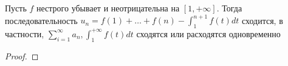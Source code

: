 
\begin{theorem}
    Пусть \(f\) нестрого убывает и неотрицательна на \([1, +\infty]\). Тогда последовательность \(u_n = f(1) + \dots + f(n) - \int_{1}^{n+1}f(t)dt\) сходится, в частности, \(\sum_{i = 1}^\infty a_n, \int_{1}^{+\infty}f(t)dt\) сходятся или расходятся одновременно
\end{theorem}
\begin{proof}
    
\end{proof}